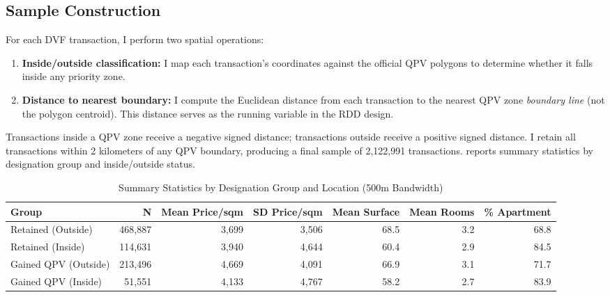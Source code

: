 \documentclass[12pt]{article}
\begin{document}
\subsection{Sample Construction}

For each DVF transaction, I perform two spatial operations:

\begin{enumerate}
    \item \textbf{Inside/outside classification:} I map each transaction's coordinates against the official QPV polygons to determine whether it falls inside any priority zone.
    \item \textbf{Distance to nearest boundary:} I compute the Euclidean distance from each transaction to the nearest QPV zone \textit{boundary line} (not the polygon centroid). This distance serves as the running variable in the RDD design.
\end{enumerate}

Transactions inside a QPV zone receive a negative signed distance; transactions outside receive a positive signed distance. I retain all transactions within 2 kilometers of any QPV boundary, producing a final sample of 2,122,991 transactions.  reports summary statistics by designation group and inside/outside status.

\begin{table}[H]
\centering
\caption{Summary Statistics by Designation Group and Location (500m Bandwidth)}
\label{tab:summary}
\begin{adjustbox}{max width=\textwidth}
\begin{tabular}[t]{lrrrrrr}
\toprule
Group & N & Mean Price/sqm & SD Price/sqm & Mean Surface & Mean Rooms & \% Apartment\\
\midrule
Retained (Outside) & 468,887 & 3,699 & 3,506 & 68.5 & 3.2 & 68.8\\
Retained (Inside) & 114,631 & 3,940 & 4,644 & 60.4 & 2.9 & 84.5\\
Gained QPV (Outside) & 213,496 & 4,669 & 4,091 & 66.9 & 3.1 & 71.7\\
Gained QPV (Inside) & 51,551 & 4,133 & 4,767 & 58.2 & 2.7 & 83.9\\
\bottomrule
\end{tabular}
\end{adjustbox}
\end{table}
\end{document}
